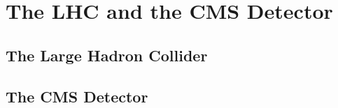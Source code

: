 \chapter{The LHC and the CMS Detector} %

\label{Chapter2} %

\section{The Large Hadron Collider}



\section{The CMS Detector}

